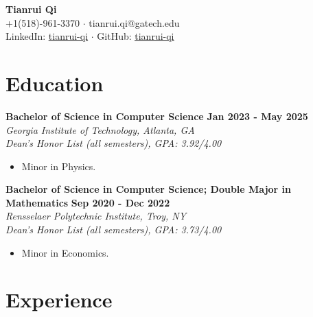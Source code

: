 \documentclass[letterpaper, 11pt]{article}
\newcommand{\subsectionvspace}{\vspace{6pt}}
\begin{document}
\begin{center}
    \textbf{\LARGE Tianrui Qi} \\
    +1(518)-961-3370 
    $\cdot$ 
    tianrui.qi@gatech.edu
    \\
    LinkedIn: \href{https://www.linkedin.com/in/tianrui-qi/}{\underline{tianrui-qi}}
    $\cdot$
    GitHub: \href{https://github.com/tianrui-qi}{\underline{tianrui-qi}}
\end{center}


\section{Education}


    \textbf{Bachelor of Science in Computer Science} \hfill 
    \textbf{Jan 2023 - May 2025} \\
    \textit{Georgia Institute of Technology, Atlanta, GA} \\ 
    \textit{Dean's Honor List (all semesters), GPA: 3.92/4.00}
    \begin{itemize}
        \item Minor in Physics.
    \end{itemize}

    \subsectionvspace

    \textbf{Bachelor of Science in Computer Science; Double Major in Mathematics} \hfill 
    \textbf{Sep 2020 - Dec 2022} \\
    \textit{Rensselaer Polytechnic Institute, Troy, NY} \\ 
    \textit{Dean's Honor List (all semesters), GPA: 3.73/4.00}
    \begin{itemize}
        \item Minor in Economics.
    \end{itemize}


\section{Experience}


\end{document}

